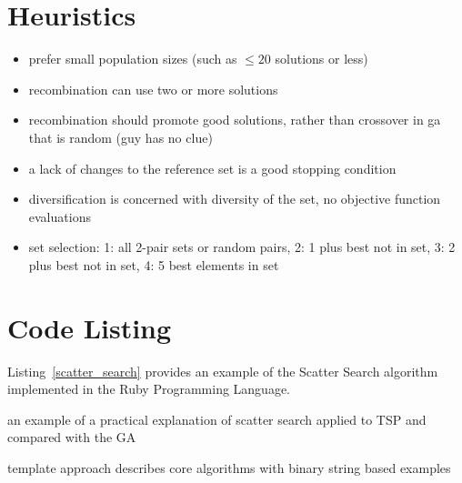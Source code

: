 \documentclass[a4paper, 11pt]{article}
\begin{document}
\section{Heuristics}
\label{sec:heuristics}
\begin{itemize}
	\item prefer small population sizes (such as  $\leq 20$ solutions or less)
	\item recombination can use two or more solutions
	\item recombination should promote good solutions, rather than crossover in ga that is random (guy has no clue)
	\item a lack of changes to the reference set is a good stopping condition
	\item diversification is concerned with diversity of the set, no objective function evaluations
	\item set selection: 1: all 2-pair sets or random pairs, 2: 1 plus best not in set, 3: 2 plus best not in set, 4: 5 best elements in set
\end{itemize}

\section{Code Listing}
\label{sec:code}
Listing~\ref{scatter_search} provides an example of the Scatter Search algorithm implemented in the Ruby Programming Language. 

an example of a practical explanation of scatter search applied to TSP and compared with the GA \cite{Marti2005}

template approach describes core algorithms with binary string based examples \cite{Glover1998a}
\end{document}
